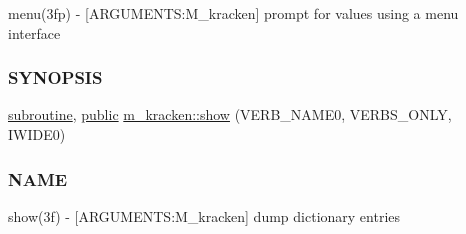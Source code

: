\begin{DoxyCompactItemize}
\begin{DoxyCompactList}
menu(3fp) -\/ \mbox{[}A\+R\+G\+U\+M\+E\+N\+TS\+:M\+\_\+kracken\mbox{]} prompt for values using a menu interface \subsubsection*{S\+Y\+N\+O\+P\+S\+IS}\end{DoxyCompactList}\item 
\hyperlink{M__stopwatch_83_8txt_acfbcff50169d691ff02d4a123ed70482}{subroutine}, \hyperlink{M__stopwatch_83_8txt_a2f74811300c361e53b430611a7d1769f}{public} \hyperlink{namespacem__kracken_ae1bb0ffb2cd28ae8cc8fade9f1988c3c}{m\+\_\+kracken\+::show} (V\+E\+R\+B\+\_\+\+N\+A\+M\+E0, V\+E\+R\+B\+S\+\_\+\+O\+N\+LY, I\+W\+I\+D\+E0)
\begin{DoxyCompactList}\small\item\em \subsubsection*{N\+A\+ME}

show(3f) -\/ \mbox{[}A\+R\+G\+U\+M\+E\+N\+TS\+:M\+\_\+kracken\mbox{]} dump dictionary entries \end{DoxyCompactList}\end{DoxyCompactItemize}
